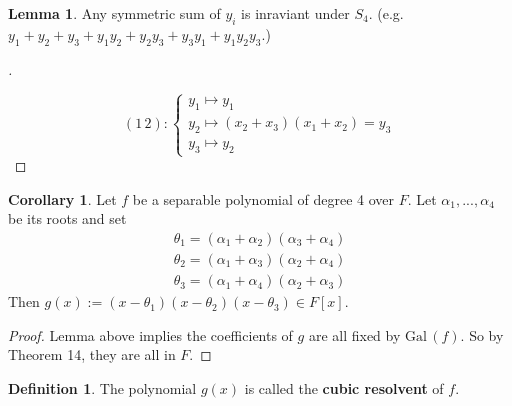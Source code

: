\documentclass{article}
\theoremstyle{definition}
\newtheorem{lem}{Lemma}
\newtheorem{dfn}{Definition}
\newtheorem{cor}{Corollary}
\newenvironment{proofs}[1][\proofname]{%
  \begin{proof}[#1]$ $\par\nobreak\ignorespaces
}{%
  \end{proof}
}
\newcommand{\Gal}{\text{Gal}\,}
\begin{document}
\begin{lem}
	Any symmetric sum of $y_i$ is inraviant under $S_4$.
	(e.g. $y_1 + y_2 + y_3 + y_1 y_2 + y_2 y_3 + y_3 y_1 + y_1 y_2 y_3$.)
\end{lem}

\begin{proofs}
	\[
		(1 \, 2): 
		\begin{cases}
			y_1 \mapsto y_1\\
			y_2 \mapsto (x_2 + x_3) (x_1 + x_2) = y_3\\
			y_3 \mapsto y_2
		\end{cases}
	\]
\end{proofs}

\begin{cor}
	Let $f$ be a separable polynomial of degree 4 over $F$.
	Let $\alpha_1, ..., \alpha_4$ be its roots and set
	\[
		\begin{split}
			\theta_1 = (\alpha_1 + \alpha_2) (\alpha_3 + \alpha_4)\\
			\theta_2 = (\alpha_1 + \alpha_3) (\alpha_2 + \alpha_4)\\
			\theta_3 = (\alpha_1 + \alpha_4) (\alpha_2 + \alpha_3)
		\end{split}
	\]
	Then $g(x) := (x - \theta_1) (x - \theta_2) (x - \theta_3) \in F[x]$.
\end{cor}

\begin{proof}
	Lemma above implies the coefficients of $g$ are all fixed by $\Gal(f)$.
	So by Theorem 14, they are all in $F$.
\end{proof}

\begin{dfn}
	The polynomial $g(x)$ is called the \textbf{cubic resolvent} of $f$.
\end{dfn}
\end{document}
